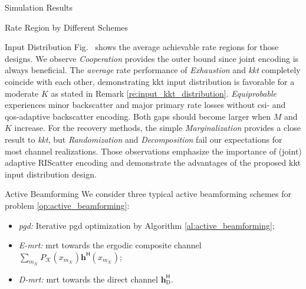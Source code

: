 \documentclass[journal]{IEEEtran}
\begin{document}
\begin{section}{Simulation Results}
\begin{subsection}{Rate Region by Different Schemes}
\begin{subsubsection}{Input Distribution}
			Fig.~ shows the average achievable rate regions for those designs.
			We observe \emph{Cooperation} provides the outer bound since joint encoding is always beneficial.
			The \emph{average} rate performance of \emph{Exhaustion} and \emph{\gls{kkt}} completely coincide with each other, demonstrating \gls{kkt} input distribution is favorable for a moderate $K$ as stated in Remark \ref{re:input_kkt_distribution}.
			\emph{Equiprobable} experiences minor backscatter and major primary rate losses without \gls{csi}- and \gls{qos}-adaptive backscatter encoding.
			Both gaps should become larger when $M$ and $K$ increase.
			For the recovery methods, the simple \emph{Marginalization} provides a close result to \emph{\gls{kkt}}, but \emph{Randomization} and \emph{Decomposition} fail our expectations for most channel realizations.
			Those observations emphasize the importance of (joint) adaptive RIScatter encoding and demonstrate the advantages of the proposed \gls{kkt} input distribution design.
		\end{subsubsection}

		\begin{subsubsection}{Active Beamforming}
			We consider three typical active beamforming schemes for problem \eqref{op:active_beamforming}:
			\begin{itemize}
				\item \emph{\gls{pgd}:} Iterative \gls{pgd} optimization by Algorithm \ref{al:active_beamforming};
				\item \emph{E-\gls{mrt}:} \gls{mrt} towards the ergodic composite channel $\sum_{m_{\mathcal{K}}} P_{\mathcal{K}}(x_{m_{\mathcal{K}}}) \boldsymbol{h}^\mathsf{H}(x_{m_{\mathcal{K}}})$;
				\item \emph{D-\gls{mrt}:} \gls{mrt} towards the direct channel $\boldsymbol{h}_{\text{D}}^\mathsf{H}$.
			\end{itemize}


\end{subsubsection}
\end{subsection}
\end{section}
\end{document}
